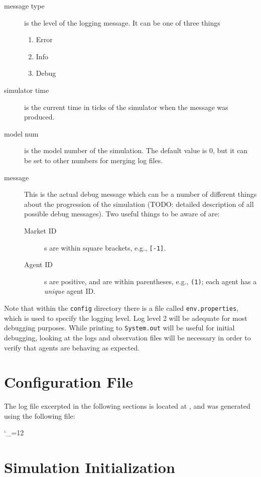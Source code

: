 \documentclass[11pt]{article}
\newcommand{\includefile}[2][]{\begingroup
  \catcode`_=12 \docode{#1}{#2}}
\newcommand{\docode}[2]{}
\begin{document}
\begin{description}
\item[message type] is the level of the logging message. It can be one of three things
  \begin{enumerate}[1)]
    \item Error
    \item Info
    \item Debug
  \end{enumerate}
\item[simulator time] is the current time in ticks of the simulator when the
  message was produced.
\item[model num] is the model number of the simulation. The default value
  is 0, but it can be set to other numbers for merging log files.
\item[message] This is the actual debug message which can be a number of
  different things about the progression of the simulation (TODO: detailed
  description of all possible debug messages). Two useful things to be aware of
  are:
  \begin{description}
  \item[Market ID]s are within square brackets, e.g., \texttt{[-1]}.
  \item[Agent ID]s are positive, and are within parentheses, e.g., \texttt{(1)};
    each agent has a \emph{unique} agent ID.
  \end{description}
\end{description}

Note that within the \texttt{config} directory there is a file called
\texttt{env.properties}, which is used to specify the logging level. Log level 2
will be adequate for most debugging purposes.
%
While printing to \texttt{System.out} will be useful for initial debugging,
looking at the logs and observation files will be necessary in order to verify
that agents are behaving as expected.

\section{Configuration File}

The log file excerpted in the following sections is located at
, and was generated using the
following  file:

\includefile{simulation_spec.json}

\section{Simulation Initialization}
\end{document}
